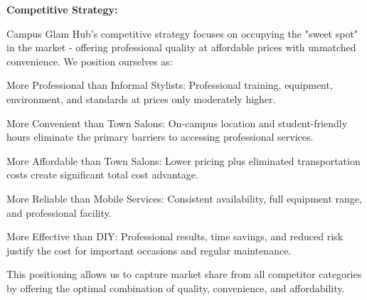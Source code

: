 \documentclass[a4paper,12pt]{article}
\begin{document}
\textbf{Competitive Strategy:}

Campus Glam Hub's competitive strategy focuses on occupying the "sweet spot" in the market - offering professional quality at affordable prices with unmatched convenience. We position ourselves as:

More Professional than Informal Stylists: Professional training, equipment, environment, and standards at prices only moderately higher.

More Convenient than Town Salons: On-campus location and student-friendly hours eliminate the primary barriers to accessing professional services.

More Affordable than Town Salons: Lower pricing plus eliminated transportation costs create significant total cost advantage.

More Reliable than Mobile Services: Consistent availability, full equipment range, and professional facility.

More Effective than DIY: Professional results, time savings, and reduced risk justify the cost for important occasions and regular maintenance.

This positioning allows us to capture market share from all competitor categories by offering the optimal combination of quality, convenience, and affordability.

\vspace{1em}
\end{document}
